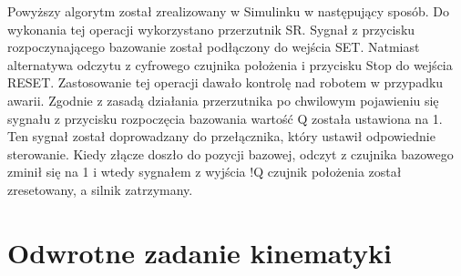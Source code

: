 Powyższy algorytm został zrealizowany w Simulinku w następujący sposób.
Do wykonania tej operacji wykorzystano przerzutnik SR. Sygnał z przycisku rozpoczynającego bazowanie został podłączony do wejścia SET. Natmiast alternatywa odczytu z cyfrowego czujnika położenia i przycisku Stop do wejścia RESET. Zastosowanie tej operacji dawało kontrolę nad robotem w przypadku awarii. Zgodnie z zasadą działania przerzutnika po chwilowym pojawieniu się sygnału z przycisku rozpoczęcia bazowania wartość Q została ustawiona na 1. Ten sygnał został doprowadzany do przełącznika, który ustawił odpowiednie sterowanie. Kiedy złącze doszło do pozycji bazowej, odczyt z czujnika bazowego zminił się na 1 i wtedy sygnałem z wyjścia !Q czujnik położenia został zresetowany, a silnik zatrzymany.
















\section{Odwrotne zadanie kinematyki}
\label{sec:odwrotneZadanieKinematyki}